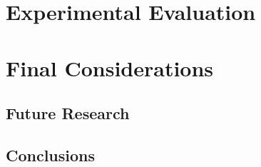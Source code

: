 \chapter{Experimental Evaluation}\label{chap:experiments}


\chapter{Final Considerations}\label{chap:conclusion}


\section{Future Research}
\section{Conclusions}